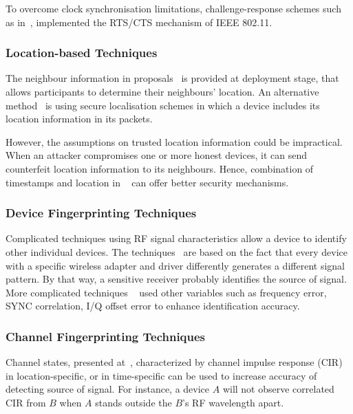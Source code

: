 To overcome clock synchronisation limitations, challenge-response schemes such as in~\cite{4110280},\cite{FaridNait-Abdesselam2008} implemented the RTS/CTS mechanism of IEEE 802.11. 

\subsubsection*{Location-based Techniques}

The neighbour information in proposals~\cite{Yih-ChunHu2002,LOUKASLAZOS,LoukasLazos2005, 4146955} is provided at deployment stage, that allows participants to determine their neighbours' location. An alternative method~\cite{1589106} is using secure localisation schemes in which a device includes its location information in its packets. 

However, the assumptions on trusted location information could be impractical. When an attacker compromises one or more honest devices, it can send counterfeit location information to its neighbours. Hence, combination of timestamps and location in ~\cite{Shokri:2009:PSN:1514274.1514302} can offer better security mechanisms.

\subsubsection*{Device Fingerprinting Techniques}

Complicated techniques using RF signal characteristics allow a device to identify other individual devices. The techniques~ \cite{Kasper, OktayUreten2007, VladimirBrik} are based on the fact that every device with a specific wireless adapter and driver differently generates a different signal pattern. By that way, a sensitive receiver probably identifies the source of signal. More complicated techniques ~\cite{SumanJana, 5211943, 819017} used other variables such as frequency error, SYNC correlation, I/Q offset error to enhance identification accuracy. 

\subsubsection*{Channel Fingerprinting Techniques}

Channel states, presented at~\cite{4289438, LiangXiao2008,LiangXiao2009,Liu:2009:SWC:1823633}, characterized by channel impulse response (CIR) in location-specific, or in time-specific can be used to increase accuracy of detecting source of signal. For instance, a device $A$ will not observe correlated CIR from $B$ when $A$ stands outside the $B$'s RF wavelength apart.

